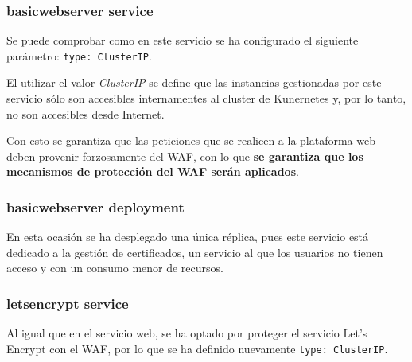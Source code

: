 \subsubsection{ basicwebserver service}
\begin{minipage}{0.8\linewidth}
  
\end{minipage}
\par Se puede comprobar como en este servicio se ha configurado el siguiente parámetro: \lstinline{type: ClusterIP}.
\par El utilizar el valor {\em ClusterIP} se define que las instancias gestionadas por este servicio sólo
son accesibles internamentes al cluster de Kunernetes y, por lo tanto, no son accesibles desde Internet.
\par Con esto se garantiza que las peticiones que se realicen a la plataforma web deben provenir
forzosamente del WAF, con lo que {\bf se garantiza que los mecanismos de protección del WAF serán
aplicados}.

\subsubsection{ basicwebserver deployment}
\begin{minipage}{0.8\linewidth}
  
\end{minipage}
\par En esta ocasión se ha desplegado una única réplica, pues este servicio está dedicado a la gestión de
certificados, un servicio al que los usuarios no tienen acceso y con un consumo menor de recursos.

\subsubsection{ letsencrypt service}
\begin{minipage}{0.8\linewidth}
  
\end{minipage}
\par Al igual que en el servicio web, se ha optado por proteger el servicio Let's Encrypt con el WAF, por
lo que se ha definido nuevamente \lstinline{type: ClusterIP}.



